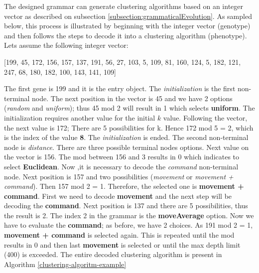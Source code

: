 \documentclass[journal]{IEEEtran}
\begin{document}
	The designed grammar can generate clustering algorithms based on an integer vector as described on subsection \ref{subsection:grammaticalEvolution}. As sampled below, this process is illustrated by beginning with the integer vector (genotype) and then follows the steps to decode it into a clustering algorithm (phenotype). Lets assume the following integer vector:
	
	[199, 45, 172, 156, 157, 137, 191, 56, 27, 103, 5, 109, 81, 160, 124, 5, 182, 121, 247, 68, 180, 182, 100, 143, 141, 109]
	
	The first gene is 199 and it is the entry object. The \textit{initialization} is the first non-terminal node. The next position in the vector is 45 and we have 2 options (\textit{random} and \textit{uniform}); thus 45 mod 2 will result in 1 which selects \textbf{uniform}. The initialization requires another value for the initial $k$ value. Following the vector, the next value is 172; There are 5 possibilities for k. Hence 172 mod 5 = 2, which is the index of the value \textbf{8}. The \textit{initialization} is ended. The second non-terminal node is \textit{distance}. There are three possible terminal nodes options. Next value on the vector is 156. The mod between 156 and 3 results in 0 which indicates to select \textbf{Euclidean}. Now ,it is necessary to decode the \textit{command} non-terminal node. Next position is 157 and two possibilities (\textit{movement} or \textit{movement + command}). Then 157 mod 2 = 1. Therefore, the selected one is \textbf{movement + command}. First we need to decode \textbf{movement} and the next step will be decoding the \textbf{command}. Next position is 137 and there are 5 possibilities, thus the result is 2. The index 2 in the grammar is the \textbf{moveAverage} option. Now we have to evaluate the \textbf{command}; as before, we have 2 choices. As 191 mod 2 = 1, \textbf{movement + command} is selected again. This is repeated until the mod results in 0 and then last \textbf{movement} is selected or until the max depth limit (400) is exceeded. The entire decoded clustering algorithm is present in Algorithm \ref{clustering-algoritm-example}
	
\end{document}
